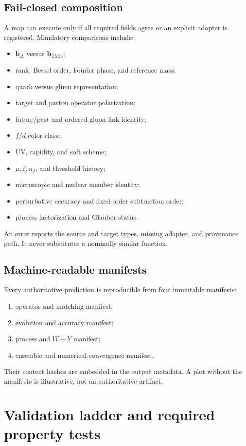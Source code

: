 \documentclass[11pt]{article}
\newcommand{\bD}{\bm{b}_{\Delta}}
\newcommand{\bM}{\bm{b}_{\mathrm{TMD}}}
\begin{document}
\subsection{Fail-closed composition}

A map can execute only if all required fields agree or an explicit adapter is
registered.  Mandatory comparisons include:
\begin{itemize}
\item \(\bD\) versus \(\bM\);
\item rank, Bessel order, Fourier phase, and reference mass;
\item quark versus gluon representation;
\item target and parton operator polarization;
\item future/past and ordered gluon link identity;
\item \(f/d\) color class;
\item UV, rapidity, and soft scheme;
\item \(\mu,\zeta,n_f\), and threshold history;
\item microscopic and nuclear member identity;
\item perturbative accuracy and fixed-order subtraction order;
\item process factorization and Glauber status.
\end{itemize}
An error reports the source and target types, missing adapter, and provenance
path.  It never substitutes a nominally similar function.

\subsection{Machine-readable manifests}

Every authoritative prediction is reproducible from four immutable manifests:
\begin{enumerate}
\item operator and matching manifest;
\item evolution and accuracy manifest;
\item process and \(W+Y\) manifest;
\item ensemble and numerical-convergence manifest.
\end{enumerate}
Their content hashes are embedded in the output metadata.  A plot without the
manifests is illustrative, not an authoritative artifact.


\section{Validation ladder and required property tests}
\label{sec:validation}
\end{document}
